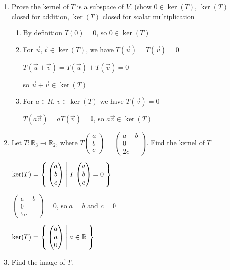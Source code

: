 \documentclass[11pt]{article}
\begin{document}
\begin{examples}
\begin{enumerate}
\item Prove the kernel of \(T\) is a subspace of \(V\). (show \(0 \in \ker(T)\), \(\ker(T)\) closed for addition, \(\ker(T)\) closed for scalar multiplication
\begin{enumerate}
\item By definition \(T(0) = 0\), so \(0 \in \ker(T)\)
\item For \(\overrightarrow{u}, \overrightarrow{v} \in \ker(T)\), we have \(T(\overrightarrow{u}) = T(\overrightarrow{v}) = 0\)

\(T(\overrightarrow{u} + \overrightarrow{v}) = T(\overrightarrow{u}) + T(\overrightarrow{v}) = 0\)

so \(\overrightarrow{u} + \overrightarrow{v} \in \ker(T)\)
\item For \(a \in R\), \(v \in \ker(T)\)  we have \(T(\overrightarrow{v}) = 0\)

\(T(a\overrightarrow{v}) = aT(\overrightarrow{v}) = 0\), so \(a \overrightarrow{v} \in \ker(T)\)
\end{enumerate}
\item Let \(T:\mathbb{R}_3 \to \mathbb{R}_2\), where \(T \left( \begin{matrix} a\\b\\c \end{matrix} \right) = \left( \begin{matrix} a-b \\ 0 \\ 2c \end{matrix} \right)\). Find the kernel of \(T\)

\(\ker(T) = \Set{\left( \begin{matrix} a\\b\\c \end{matrix} \right) | T \left( \begin{matrix} a\\b\\c \end{matrix} \right) = 0 }\)

\(\left( \begin{matrix} a-b \\ 0 \\ 2c \end{matrix} \right) = 0\), so \(a = b\) and \(c = 0\)

\(\ker(T) = \Set{\left( \begin{matrix} a\\a\\0 \end{matrix} \right) | a \in \mathbb{R} }\)
\item Find the image of \(T\).


\end{enumerate}
\end{examples}
\end{document}
